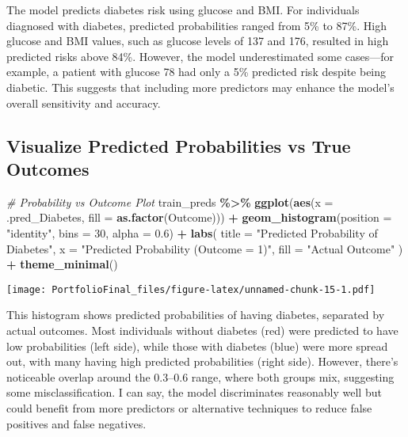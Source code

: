 \documentclass[
]{article}
\newenvironment{Shaded}{\begin{snugshade}}{\end{snugshade}}
\newcommand{\AttributeTok}[1]{\textcolor[rgb]{0.13,0.29,0.53}{#1}}
\newcommand{\CommentTok}[1]{\textcolor[rgb]{0.56,0.35,0.01}{\textit{#1}}}
\newcommand{\DecValTok}[1]{\textcolor[rgb]{0.00,0.00,0.81}{#1}}
\newcommand{\FloatTok}[1]{\textcolor[rgb]{0.00,0.00,0.81}{#1}}
\newcommand{\FunctionTok}[1]{\textcolor[rgb]{0.13,0.29,0.53}{\textbf{#1}}}
\newcommand{\NormalTok}[1]{#1}
\newcommand{\SpecialCharTok}[1]{\textcolor[rgb]{0.81,0.36,0.00}{\textbf{#1}}}
\newcommand{\StringTok}[1]{\textcolor[rgb]{0.31,0.60,0.02}{#1}}
\begin{document}
The model predicts diabetes risk using glucose and BMI. For individuals
diagnosed with diabetes, predicted probabilities ranged from 5\% to
87\%. High glucose and BMI values, such as glucose levels of 137 and
176, resulted in high predicted risks above 84\%. However, the model
underestimated some cases---for example, a patient with glucose 78 had
only a 5\% predicted risk despite being diabetic. This suggests that
including more predictors may enhance the model's overall sensitivity
and accuracy.

\subsection{Visualize Predicted Probabilities vs True
Outcomes}\label{visualize-predicted-probabilities-vs-true-outcomes}

\begin{Shaded}
\begin{Highlighting}[]
\CommentTok{\# Probability vs Outcome Plot}
\NormalTok{train\_preds }\SpecialCharTok{\%\textgreater{}\%}
  \FunctionTok{ggplot}\NormalTok{(}\FunctionTok{aes}\NormalTok{(}\AttributeTok{x =}\NormalTok{ .pred\_Diabetes, }\AttributeTok{fill =} \FunctionTok{as.factor}\NormalTok{(Outcome))) }\SpecialCharTok{+}
  \FunctionTok{geom\_histogram}\NormalTok{(}\AttributeTok{position =} \StringTok{"identity"}\NormalTok{, }\AttributeTok{bins =} \DecValTok{30}\NormalTok{, }\AttributeTok{alpha =} \FloatTok{0.6}\NormalTok{) }\SpecialCharTok{+}
  \FunctionTok{labs}\NormalTok{(}
    \AttributeTok{title =} \StringTok{"Predicted Probability of Diabetes"}\NormalTok{,}
    \AttributeTok{x =} \StringTok{"Predicted Probability (Outcome = 1)"}\NormalTok{,}
    \AttributeTok{fill =} \StringTok{"Actual Outcome"}
\NormalTok{  ) }\SpecialCharTok{+}
  \FunctionTok{theme\_minimal}\NormalTok{()}
\end{Highlighting}
\end{Shaded}

\texttt{[image: PortfolioFinal\_files/figure-latex/unnamed-chunk-15-1.pdf]}

This histogram shows predicted probabilities of having diabetes,
separated by actual outcomes. Most individuals without diabetes (red)
were predicted to have low probabilities (left side), while those with
diabetes (blue) were more spread out, with many having high predicted
probabilities (right side). However, there's noticeable overlap around
the 0.3--0.6 range, where both groups mix, suggesting some
misclassification. I can say, the model discriminates reasonably well
but could benefit from more predictors or alternative techniques to
reduce false positives and false negatives.
\end{document}
